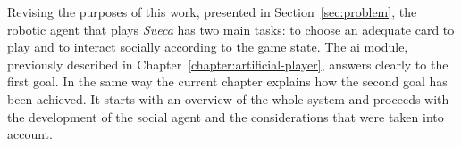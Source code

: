\label{chapter:sueca-player}

Revising the purposes of this work, presented in Section~\ref{sec:problem}, the robotic agent that plays \emph{Sueca} has two main tasks: to choose an adequate card to play and to interact socially according to the game state.
The \ac{ai} module, previously described in Chapter~\ref{chapter:artificial-player}, answers clearly to the first goal.
In the same way the current chapter explains how the second goal has been achieved.
It starts with an overview of the whole system and proceeds
with the development of the social agent and the considerations that were taken into account.




\clearpage

